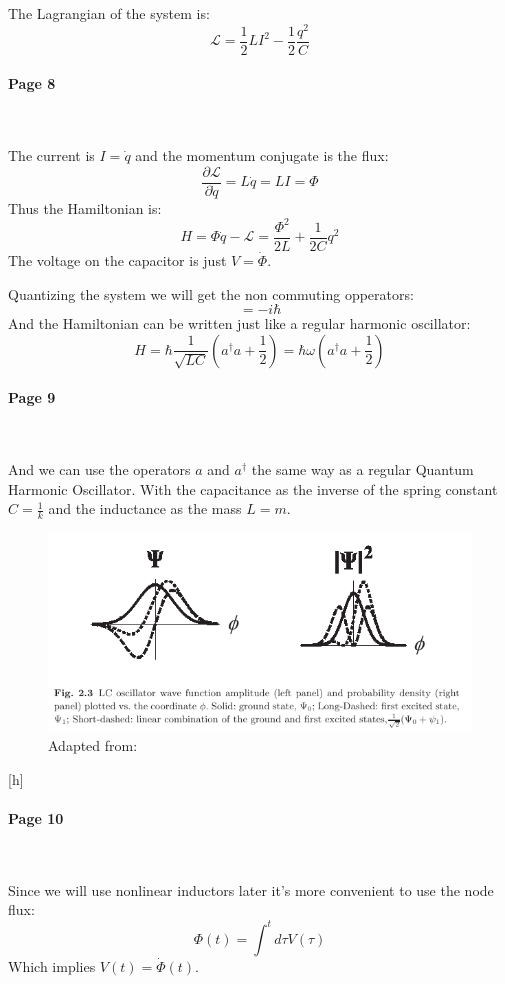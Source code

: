 \documentclass[12pt]{article}
\numberwithin{equation}{subsection}
\newcommand\page[1]{
{
\color{blue}\paragraph{
Page #1
}\mbox{}\\
}
}
\begin{document}
The Lagrangian of the system is:
\begin{equation}
    \mathcal L = \frac{1}{2} LI^2 - \frac{1}{2}\frac{q^2}{C}
\end{equation}
\page{8}
The current is $I=\dot q$ and the momentum conjugate is the flux:
\begin{equation}
\frac{\partial \mathcal L}{\partial \dot q} = L\dot q = LI = \Phi
\end{equation}
Thus the Hamiltonian is:
\begin{equation}
    H= \Phi\dot q - \mathcal L = \frac{\Phi^2}{2L} + \frac{1}{2C} q^2
\end{equation}
The voltage on the capacitor is just $V=\dot \Phi$.

Quantizing the system we will get the non commuting opperators:
\begin{equation}
    [\hat \Phi , \hat q] = -i \hbar
\end{equation}
And the Hamiltonian can be written just like a regular harmonic oscillator:
\begin{equation}
    H = \hbar \frac{1}{\sqrt{LC}} (a^\dagger a + \frac{1}{2}) =  \hbar \omega (a^\dagger a + \frac{1}{2})
\end{equation}
\page{9}
And we can use the operators $a$ and $a^\dagger$ the same way as a regular Quantum Harmonic Oscillator. 
With the capacitance as the inverse of the spring constant $C = \frac{1}{k}$ and the inductance as the mass $L=m$. 

\begin{figure}[h]
\includegraphics[scale=3]{images/14-wave-lc.png}
\caption{Adapted from: \cite{Girvin2015CircuitQS}}
\end{figure}[h]

\page{10}

Since we will use nonlinear inductors later it's more convenient to use the node flux:
\begin{equation}
    \Phi(t) = \int ^t d\tau V(\tau)
\end{equation}
Which implies $V(t)= \dot \Phi(t)$.
\end{document}

